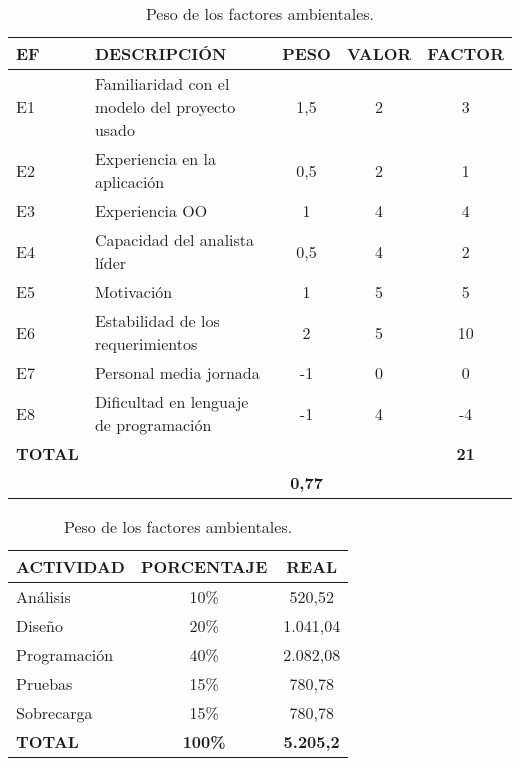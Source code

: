 \begin{table}[!hb]
\begin{center}
\begin{tabular}{l l c c c}
\textbf{EF} & \textbf{DESCRIPCIÓN} & \textbf{PESO} & \textbf{VALOR} & \textbf{FACTOR}\\ \hline \hline
E1	&	Familiaridad con el modelo del proyecto usado	&	1,5	&	2	&	3	\\
E2	&	Experiencia en la aplicación	&	0,5	&	2	&	1	\\
E3	&	Experiencia OO	&	1	&	4	&	4	\\
E4	&	Capacidad del analista líder	&	0,5	&	4	&	2	\\
E5	&	Motivación	&	1	&	5	&	5	\\
E6	&	Estabilidad de los requerimientos	&	2	&	5	&	10	\\
E7	&	Personal media jornada	&	-1	&	0	&	0	\\
E8	&	Dificultad en lenguaje de programación	&	-1	&	4	&	-4	\\ \hline
\textbf{TOTAL} & & & & \textbf{21}\\ \hline \hline
\multicolumn{2}{l}{}\textbf{Factores ambientales} & \textbf{0,77} & & \\ \hline \hline
\end{tabular}
\caption{Peso de los factores ambientales.}
\label{tab:ef}
\end{center}
\end{table}

\begin{table}[!hb]
\begin{center}
\begin{tabular}{l c c}
\textbf{ACTIVIDAD} & \textbf{PORCENTAJE} & \textbf{REAL}\\ \hline \hline
Análisis & 10\% & 520,52 \\
Diseño & 20\% & 1.041,04 \\
Programación & 40\% & 2.082,08 \\
Pruebas & 15\% & 780,78 \\
Sobrecarga & 15\% & 780,78 \\ \hline
\textbf{TOTAL} & \textbf{100\%} & \textbf{5.205,2}\\ \hline \hline
\end{tabular}
\caption{Peso de los factores ambientales.}
\label{tab:porcentajeAct}
\end{center}
\end{table}
